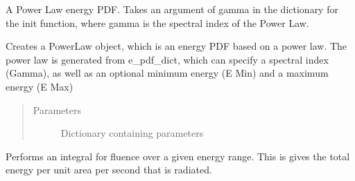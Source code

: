 \documentclass[letterpaper,10pt,english]{sphinxmanual}
\begin{document}

\begin{fulllineitems}
A Power Law energy PDF. Takes an argument of gamma in the dictionary
for the init function, where gamma is the spectral index of the Power Law.

\begin{fulllineitems}
Creates a PowerLaw object, which is an energy PDF based on a power
law. The power law is generated from e\_pdf\_dict, which can specify a
spectral index (Gamma), as well as an optional minimum energy (E Min)
and a maximum energy (E Max)
\begin{quote}\begin{description}
\item[{Parameters}] \leavevmode
{} \textendash{} Dictionary containing parameters

\end{description}\end{quote}

\end{fulllineitems}


\begin{fulllineitems}
\end{fulllineitems}


\begin{fulllineitems}
Performs an integral for fluence over a given energy range. This is
gives the total energy per unit area per second that is radiated.


\end{fulllineitems}
\end{fulllineitems}
\end{document}
